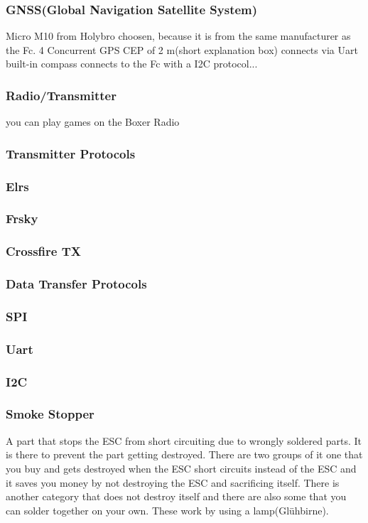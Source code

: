 \documentclass{article}
\begin{document}
	\subsubsection{GNSS(Global Navigation Satellite System)}
	Micro M10 from Holybro choosen, because it is from the same manufacturer as the Fc.
	4 Concurrent GPS
	CEP of 2 m(short explanation box)
	connects via Uart
	\\ built-in compass connects to the Fc with a I2C protocol...
	
	
	\subsubsection{Radio/Transmitter}
	
	you can play games on the Boxer Radio
	\subsubsection{Transmitter Protocols}
	\subsubsection*{Elrs}
	\subsubsection*{Frsky}
	\subsubsection*{Crossfire TX}
	
	\subsubsection{Data Transfer Protocols}
	\subsubsection*{SPI}
	\subsubsection*{Uart}
	\subsubsection*{I2C}
	
	\subsubsection{Smoke Stopper}
	A part that stops the ESC from short circuiting due to wrongly soldered parts. It is there to prevent the part getting destroyed. There are two groups of it one that you buy and gets destroyed when the ESC short circuits instead of the ESC and it saves you money by not destroying the ESC and sacrificing itself. There is another category that does not destroy itself and there are also some that you can solder together on your own. These work by using a lamp(Glühbirne).
	
\end{document}
